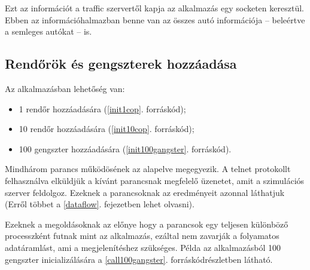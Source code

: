 \documentclass[a4paper,12pt]{report}
\begin{document}
\vspace{2mm}
Ezt az információt a traffic szervertől kapja az alkalmazás egy socketen keresztül. Ebben az információhalmazban benne van az összes autó információja -- beleértve a semleges autókat -- is.

\subsection{Rendőrök és gengszterek hozzáadása}
\label{addcops}

Az alkalmazásban lehetőség van:

\begin{itemize}
\item 1 rendőr hozzáadására (\ref{init1cop}. forráskód);
\item 10 rendőr hozzáadására (\ref{init10cop}. forráskód);
\item 100 gengszter hozzáadására (\ref{init100gangster}. forráskód).
\end{itemize}







Mindhárom parancs működösének az alapelve megegyezik. A telnet protokollt felhasználva elküldjük a kívánt parancsnak megfelelő üzenetet, amit a szimulációs szerver feldolgoz. Ezeknek a parancsoknak az eredményeit azonnal láthatjuk (Erről többet a \ref{dataflow}. fejezetben lehet olvasni).

\vspace{2mm}
Ezeknek a megoldásoknak az előnye hogy a parancsok egy teljesen különböző processzként futnak mint az alkalmazás, ezáltal nem zavarják a folyamatos adatáramlást, ami a megjelenítéshez szükséges. Példa az alkalmazásból 100 gengszter inicializálására a \ref{call100gangster}. forráskódrészletben látható.


\end{document}
